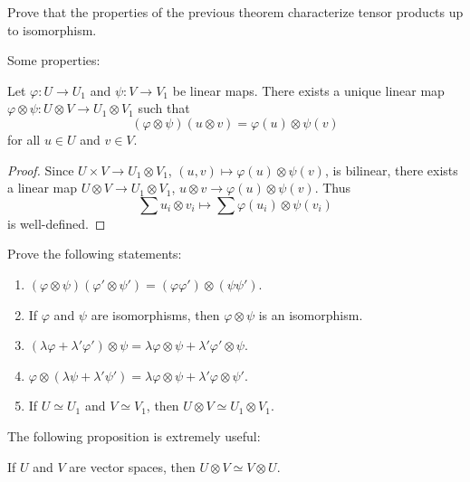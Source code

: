 \begin{exercise}
	\label{xca:tensorial_unicidad}
	Prove that the properties of the previous theorem characterize tensor products up to isomorphism. 
\end{exercise}

Some properties:

\begin{proposition}
	Let $\varphi\colon U\to U_1$ and $\psi\colon V\to V_1$ be linear maps. There
	exists a unique linear map 
	$\varphi\otimes\psi\colon U\otimes V\to U_1\otimes V_1$ such that
	\[
		(\varphi\otimes\psi)(u\otimes v)=\varphi(u)\otimes\psi(v)
	\]
	for all $u\in U$ and $v\in V$.
\end{proposition}

\begin{proof}
	Since $U\times V\to U_1\otimes V_1$,
	$(u,v)\mapsto\varphi(u)\otimes\psi(v)$, is bilinear, there exists a linear map
	$U\otimes V\to U_1\otimes V_1$, $u\otimes
	v\to\varphi(u)\otimes\psi(v)$. Thus 
	\[
		\sum u_i\otimes v_i\mapsto\sum\varphi(u_i)\otimes\psi(v_i)
	\]
	is well-defined. 
\end{proof}

\begin{exercise}
    Prove the following statements:
	\begin{enumerate}
		\item $(\varphi\otimes\psi)(\varphi'\otimes\psi')=(\varphi\varphi')\otimes(\psi\psi')$.
		\item If $\varphi$ and $\psi$ are isomorphisms, then 
			$\varphi\otimes\psi$ is an isomorphism. 
		\item $(\lambda\varphi+\lambda'\varphi')\otimes\psi=\lambda\varphi\otimes\psi+\lambda'\varphi'\otimes\psi$.
		\item $\varphi\otimes(\lambda\psi+\lambda'\psi')=\lambda\varphi\otimes\psi+\lambda'\varphi\otimes\psi'$.
		\item If $U\simeq U_1$ and $V\simeq V_1$, then $U\otimes V\simeq U_1\otimes V_1$.
	\end{enumerate}
\end{exercise}

The following proposition is extremely useful:

\begin{proposition}
	If $U$ and $V$ are vector spaces, then  
	$U\otimes V\simeq V\otimes U$.
\end{proposition}

